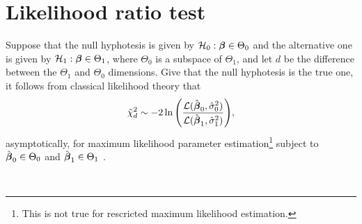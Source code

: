 \documentclass[twocolumn,draft]{article}
\begin{document}
	\section{Likelihood ratio test}

	Suppose that the null hyphotesis is given by
	$\mathcal{H}_0: \boldsymbol{\beta} \in \Theta_0$ and the alternative one is given by
	$\mathcal{H}_1: \boldsymbol{\beta} \in \Theta_1$, where $\Theta_0$ is a subspace of $\Theta_1$,
	and let $d$ be the difference between the $\Theta_1$ and $\Theta_0 $
	dimensions.
	Give that the null hyphotesis is the true one,
	it follows from classical likelihood theory that
	\begin{equation*}
			\tilde{\chi}^2_d \sim -2\ln
				\Bigg(
						\frac{\mathcal{L}(\hat{\boldsymbol{\beta}}_0, \hat\sigma_0^2)}
								     {\mathcal{L}(\hat{\boldsymbol{\beta}}_1, \hat\sigma_1^2)}
								     	\Bigg),
	\end{equation*}
	asymptotically, for maximum likelihood parameter estimation\footnote{This is
	not true for rescricted maximum likelihood estimation.}
	subject to $\hat{\boldsymbol{\beta}}_0 \in \Theta_0$ and $\hat{\boldsymbol{\beta}}_1 \in \Theta_1$
	\cite{verbeke2009linear}.

	\printbibliography\
\end{document}
